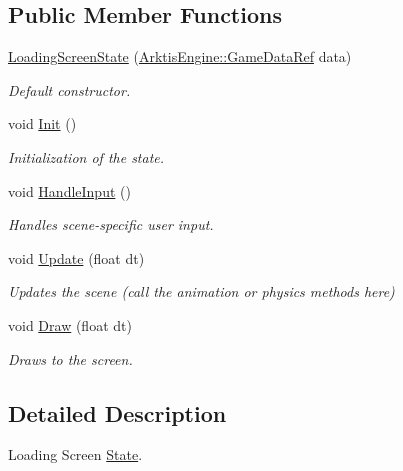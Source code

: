 \subsection*{Public Member Functions}
\begin{DoxyCompactItemize}
\item 
\mbox{\hyperlink{class_states_1_1_loading_screen_state_a4cbc4591072bff067015b5b959811980}{Loading\+Screen\+State}} (\mbox{\hyperlink{namespace_arktis_engine_a52e783ae007274e2a6eccc201d9400a5}{Arktis\+Engine\+::\+Game\+Data\+Ref}} data)
\begin{DoxyCompactList}\small\item\em Default constructor. \end{DoxyCompactList}\item 
void \mbox{\hyperlink{class_states_1_1_loading_screen_state_aa6783276ac59b0c137d062251ddc719a}{Init}} ()
\begin{DoxyCompactList}\small\item\em Initialization of the state. \end{DoxyCompactList}\item 
void \mbox{\hyperlink{class_states_1_1_loading_screen_state_a3a473b2cf717f183e4573344405b7b49}{Handle\+Input}} ()
\begin{DoxyCompactList}\small\item\em Handles scene-\/specific user input. \end{DoxyCompactList}\item 
void \mbox{\hyperlink{class_states_1_1_loading_screen_state_aff3b4dab779277f43cca4b4409f59a35}{Update}} (float dt)
\begin{DoxyCompactList}\small\item\em Updates the scene (call the animation or physics methods here) \end{DoxyCompactList}\item 
void \mbox{\hyperlink{class_states_1_1_loading_screen_state_ab59e574f0ccfd3471c7f919df96190a5}{Draw}} (float dt)
\begin{DoxyCompactList}\small\item\em Draws to the screen. \end{DoxyCompactList}\end{DoxyCompactItemize}


\subsection{Detailed Description}
Loading Screen \mbox{\hyperlink{class_states_1_1_state}{State}}. 

